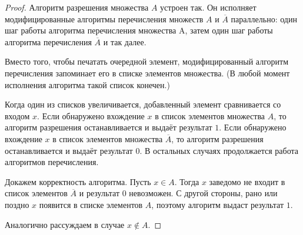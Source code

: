 \documentclass[a4paper, 12pt]{article}
\begin{document}
\begin{proof}

Алгоритм разрешения множества $A$ устроен так. Он исполняет
модифицированные алгоритмы перечисления множеств $A$ и $\overline{A}$ параллельно: один шаг работы алгоритма перечисления множества A, затем один шаг работы алгоритма перечисления $\overline{A}$ и так далее.

Вместо того, чтобы печатать очередной элемент, модифицированный алгоритм
перечисления запоминает его в списке элементов множества. (В любой момент исполнения алгоритма такой список конечен.)

Когда один из списков увеличивается, добавленный элемент сравнивается со входом $x$. Если обнаружено вхождение $x$ в список элементов множества $A$, то алгоритм разрешения останавливается и выдаёт результат $1$. Если обнаружено вхождение $x$ в список элементов множества $\overline{A}$, то алгоритм разрешения останавливается и выдаёт результат 0. В остальных случаях продолжается работа алгоритмов перечисления.

Докажем корректность алгоритма. Пусть $x \in A$. Тогда $x$ заведомо не входит в список элементов $\overline{A}$ и результат $0$ невозможен. С другой стороны, рано или поздно $x$ появится в списке элементов $A$, поэтому алгоритм выдаст результат $1$.

Аналогично рассуждаем в случае $x \notin A$.

\end{proof}
    
\end{document}

